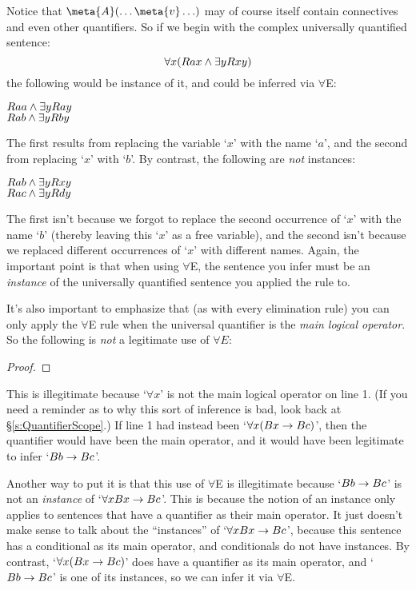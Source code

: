 Notice that $\meta{A}(\ldots \meta{v} \ldots)$ may of course itself contain connectives and even other quantifiers.  So if we begin with the complex universally quantified sentence:
$$\forall x(Rax \wedge \exists yRxy)$$
the following would be instance of it, and could be inferred via $\forall$E:
\begin{center}
$Raa \wedge \exists yRay$\\
$Rab \wedge \exists yRby$
\end{center}
The first results from replacing the variable `$x$' with the name `$a$', and the second from replacing `$x$' with `$b$'. By contrast, the following are \emph{not} instances:
\begin{center}
$Rab \wedge \exists yRxy$\\
$Rac \wedge \exists yRdy$
\end{center}
The first isn't because we forgot to replace the second occurrence of `$x$' with the name `$b$' (thereby leaving this `$x$' as a free variable), and the second isn't because we replaced different occurrences of `$x$' with different names.  Again, the important point is that when using $\forall$E, the sentence you infer must be an \emph{instance} of the universally quantified sentence you applied the rule to.



It's also important to emphasize that (as with every elimination rule) you can only apply the $\forall$E rule when the universal quantifier is the \emph{main logical operator}. So the following is \emph{not} a legitimate use of $\forall E$:
\begin{proof}
\end{proof}
This is illegitimate because `$\forall x$' is not the main logical operator on line 1. (If you need a reminder as to why this sort of inference is bad, look back at \S\ref{s:QuantifierScope}.)  If line 1 had instead been `$\forall x(Bx \rightarrow Bc)$', then the quantifier would have been the main operator, and it would have been legitimate to infer `$Bb \rightarrow Bc$'.

Another way to put it is that this use of $\forall$E is illegitimate because `$Bb \rightarrow Bc$' is not an \emph{instance} of `$\forall x Bx \rightarrow Bc$'.  This is because the notion of an instance only applies to sentences that have a quantifier as their main operator.  It just doesn't make sense to talk about the ``instances'' of `$\forall x Bx \rightarrow Bc$', because this sentence has a conditional as its main operator, and conditionals do not have instances.  By contrast, `$\forall x(Bx \rightarrow Bc)$' does have a quantifier as its main operator, and `$Bb \rightarrow Bc$' is one of its instances, so we can infer it via $\forall$E.

